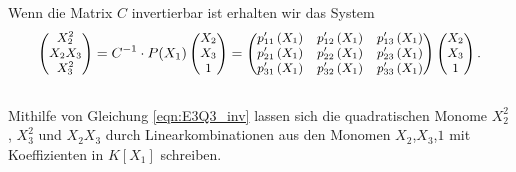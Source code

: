 \documentclass[11pt]{beamer}
\theoremstyle{custom}
\theoremstyle{custom}
\begin{document}
	\begin{frame}
		Wenn die Matrix $C$ invertierbar ist erhalten wir das System\\
		\begin{equation}\label{eqn:E3Q3_inv}
			\small
			\begin{pmatrix}
				X_{2}^2\\X_{2}X_{3}\\X_{3}^2
			\end{pmatrix} 
			=
			C^{-1} \cdot P(X_{1})
			\begin{pmatrix}
				X_{2}\\X_{3}\\1
			\end{pmatrix}
			=
			\begin{pmatrix}
				p'_{11}\left(X_{1}\right)&p'_{12}\left(X_{1}\right)&p'_{13}\left(X_{1}\right)\\
				p'_{21}\left(X_{1}\right)&p'_{22}\left(X_{1}\right)&p'_{23}\left(X_{1}\right)\\
				p'_{31}\left(X_{1}\right)&p'_{32}\left(X_{1}\right)&p'_{33}\left(X_{1}\right)\\
			\end{pmatrix}
			\begin{pmatrix}
				X_{2}\\X_{3}\\1
			\end{pmatrix}
			.
		\end{equation}
		~\\
		Mithilfe von Gleichung \eqref{eqn:E3Q3_inv} lassen sich die quadratischen Monome $X_{2}^2$, $X_{3}^2$ und $X_{2}X_{3}$ durch Linearkombinationen aus den Monomen $X_{2}$,$X_{3}$,$1$ mit Koeffizienten in $K\left[X_{1}\right] $ schreiben.
	\end{frame}
\end{document}
